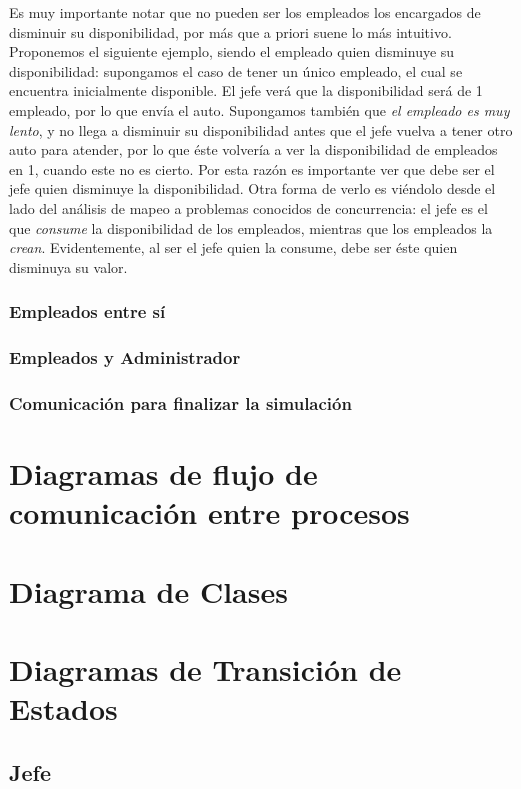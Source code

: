 \documentclass[a4paper,12pt]{article}
\begin{document}
Es muy importante notar que no pueden ser los empleados los encargados de disminuir su disponibilidad, por más que a priori suene lo más intuitivo. Proponemos el siguiente ejemplo, siendo el empleado quien disminuye su disponibilidad: supongamos el caso de tener un único empleado, el cual se encuentra inicialmente disponible. El jefe verá que la disponibilidad será de 1 empleado, por lo que envía el auto. Supongamos también que \textit{el empleado es muy lento}, y no llega a disminuir su disponibilidad antes que el jefe vuelva a tener otro auto para atender, por lo que éste volvería a ver la disponibilidad de empleados en 1, cuando este no es cierto. Por esta razón es importante ver que debe ser el jefe quien disminuye la disponibilidad. Otra forma de verlo es viéndolo desde el lado del análisis de mapeo a problemas conocidos de concurrencia: el jefe es el que \textit{consume} la disponibilidad de los empleados, mientras que los empleados la \textit{crean}. Evidentemente, al ser el jefe quien la consume, debe ser éste quien disminuya su valor.


\subsubsection{Empleados entre sí}
\subsubsection{Empleados y Administrador}
\subsubsection{Comunicación para finalizar la simulación}

\section{Diagramas de flujo de comunicación entre procesos}

\section{Diagrama de Clases}

\section{Diagramas de Transición de Estados}
\subsection{Jefe}
\end{document}
